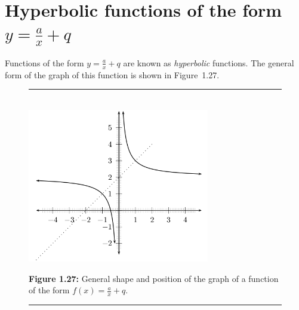 \section{ Hyperbolic functions of the form $y=\frac{a}{x}+q$}
\nopagebreak
{}           
\label{m39341*id246121}Functions of the form $y=\frac{a}{x}+q$ are known as \textsl{hyperbolic} functions. The general form of the graph of this function is shown in Figure~1.27.\par 
\setcounter{subfigure}{0}
\begin{figure}[H] %
\begin{center}
\rule[.1in]{\figurerulewidth}{.005in} \\
\label{m39341*uid138!!!underscore!!!media}\label{m39341*uid138!!!underscore!!!printimage}\includegraphics[width=300px]{col11306.imgs/m39341_MG10C11_021.png} %
\vspace{2pt}
\vspace{\rubberspace}\par \begin{cnxcaption}
\small \textbf{Figure 1.27: }General shape and position of the graph of a function of the form $f\left(x\right)=\frac{a}{x}+q$.
\end{cnxcaption}
\vspace{.1in}
\rule[.1in]{\figurerulewidth}{.005in} \\
\end{center}
\end{figure}       
\label{m39341*secfhsst!!!underscore!!!id2774}
\nopagebreak
